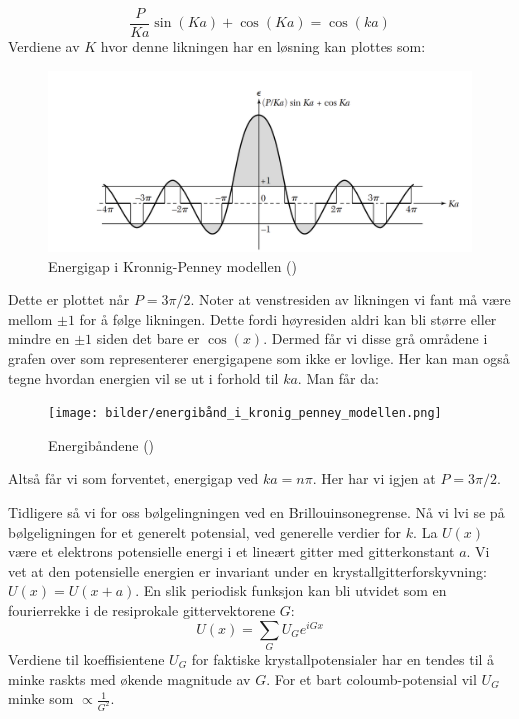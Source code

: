 \documentclass{article}
\begin{document}
\begin{equation}
    \frac{P}{Ka} \sin(Ka) + \cos(Ka) = \cos(ka)
\end{equation}
Verdiene av $K$ hvor denne likningen har en løsning kan plottes som:
\begin{figure}[H]
    \centering
    \includegraphics[width=0.5\linewidth]{bilder/energigap_kronigpenney_modellen.png}
    \caption{Energigap i Kronnig-Penney modellen (\cite{kittel_solid_state_physics})}
\label{fig:energigap_kronigpenney_modellenl}
\end{figure}
Dette er plottet når $P = 3 \pi / 2$. Noter at venstresiden av likningen vi fant må være mellom $\pm 1$ for å følge likningen. Dette fordi høyresiden aldri kan bli større eller mindre en $\pm 1$ siden det bare er $\cos(x)$. Dermed får vi disse grå områdene i grafen over som representerer energigapene som ikke er lovlige. Her kan man også tegne hvordan energien vil se ut i forhold til $ka$. Man får da:
\begin{figure}[H]
    \centering
    \texttt{[image: bilder/energibånd\_i\_kronig\_penney\_modellen.png]}
    \caption{Energibåndene (\cite{kittel_solid_state_physics})}
    \label{fig:energibånd_i_kronig_penney_modellen}
\end{figure}
Altså får vi som forventet, energigap ved $ka = n \pi$. Her har vi igjen at $ P = 3\pi / 2$.

Tidligere så vi for oss bølgelingningen ved en Brillouinsonegrense. Nå vi lvi se på bølgeligningen for et generelt potensial, ved generelle verdier for $k$. La $U(x)$ være et elektrons potensielle energi i et lineært gitter med gitterkonstant $a$. Vi vet at den potensielle energien er invariant under en krystallgitterforskyvning: $U(x) = U(x+a)$. En slik periodisk funksjon kan bli utvidet som en fourierrekke i de resiprokale gittervektorene $G$:
\begin{equation}
    U(x) = \sum_G U_G e^{i G x}
\end{equation}
Verdiene til koeffisientene $U_G$ for faktiske krystallpotensialer har en tendes til å minke raskts med økende magnitude av $G$. For et bart coloumb-potensial vil $U_G$ minke som $\propto\frac{1}{G^2}$.
\end{document}
